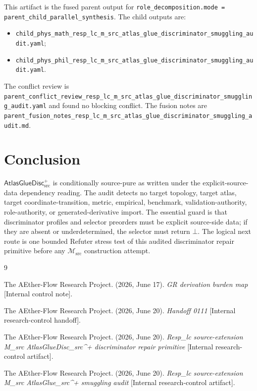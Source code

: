\documentclass[11pt]{article}
\newcommand{\Msrc}{\mathcal{M}_{\mathrm{src}}}
\newcommand{\AtlasGlueDisc}{\mathsf{AtlasGlueDisc}_{\mathrm{src}}^{+}}
\begin{document}
This artifact is the fused parent output for
\texttt{role\_decomposition.mode = parent\_child\_parallel\_synthesis}. The
child outputs are:
\begin{itemize}
  \item \texttt{child\_phys\_math\_resp\_lc\_m\_src\_atlas\_glue\_discriminator\_smuggling\_audit.yaml};
  \item \texttt{child\_phys\_phil\_resp\_lc\_m\_src\_atlas\_glue\_discriminator\_smuggling\_audit.yaml}.
\end{itemize}
The conflict review is
\texttt{parent\_conflict\_review\_resp\_lc\_m\_src\_atlas\_glue\_discriminator\_smuggling\_audit.yaml}
and found no blocking conflict. The fusion notes are
\texttt{parent\_fusion\_notes\_resp\_lc\_m\_src\_atlas\_glue\_discriminator\_smuggling\_audit.md}.

\section{Conclusion}

\(\AtlasGlueDisc\) is conditionally source-pure as written under the
explicit-source-data dependency reading. The audit detects no target topology,
target atlas, target coordinate-transition, metric, empirical, benchmark,
validation-authority, role-authority, or generated-derivative import. The
essential guard is that discriminator profiles and selector preorders must be
explicit source-side data; if they are absent or underdetermined, the selector
must return \(\bot\). The logical next route is one bounded Refuter stress
test of this audited discriminator repair primitive before any \(\Msrc\)
construction attempt.

\begin{thebibliography}{9}

The AEther-Flow Research Project. (2026, June 17). \emph{GR derivation burden
map} [Internal control note].

The AEther-Flow Research Project. (2026, June 20). \emph{Handoff 0111}
[Internal research-control handoff].

The AEther-Flow Research Project. (2026, June 20). \emph{Resp\_lc
source-extension M\_src AtlasGlueDisc\_src\^{}+ discriminator repair
primitive} [Internal research-control artifact].

The AEther-Flow Research Project. (2026, June 20). \emph{Resp\_lc
source-extension M\_src AtlasGlue\_src\^{}+ smuggling audit} [Internal
research-control artifact].

\end{thebibliography}
\end{document}
